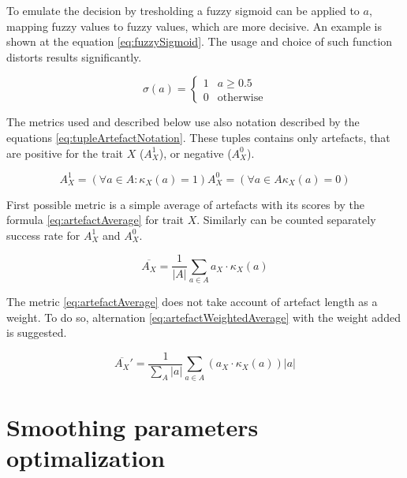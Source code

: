 To emulate the decision by tresholding a fuzzy sigmoid can be applied to $a$,
mapping fuzzy values to fuzzy values, which are more decisive. An example is
shown at the equation \ref{eq:fuzzySigmoid}. The usage and choice of such
function distorts results significantly.

\begin{equation}
\sigma(a) = \begin{cases} 1 & a \geq 0.5 \\
            0 & \text{otherwise} \end{cases}
\label{eq:fuzzySigmoid}
\end{equation}

The metrics used and described below use also notation described by the equations
\ref{eq:tupleArtefactNotation}. These tuples contains only artefacts, that are
positive for the trait $X$ ($A_{X}^{1}$), or negative ($A_{X}^{0}$).

\begin{subequations}
\begin{equation}
A_{X}^{1} = (\forall a \in A: \kappa_{X}(a) = 1)
\end{equation}
\begin{equation}
A_{X}^{0} = (\forall a \in A \kappa_{X}(a) = 0)
\end{equation}
\label{eq:tupleArtefactNotation}
\end{subequations}

First possible metric is a simple average of artefacts with its scores by the
formula \ref{eq:artefactAverage} for trait $X$. Similarly can be counted
separately success rate for $A_{X}^{1}$ and $A_{X}^{0}$.

\begin{equation}
\overline{A_{X}} = \frac{1}{|A|} \sum_{a\in A} a_{X} \cdot \kappa_{X}(a)
\label{eq:artefactAverage}
\end{equation}

The metric \ref{eq:artefactAverage} does not take account of artefact length
as a weight. To do so, alternation \ref{eq:artefactWeightedAverage} with the
weight added is suggested.

\begin{equation}
\overline{A_{X}}' = \frac{1}{\sum_{A}|a|}\sum_{a\in A} (a_{X} \cdot \kappa_{X}(a)) |a|
\label{eq:artefactWeightedAverage}
\end{equation}

\section{Smoothing parameters optimalization}


